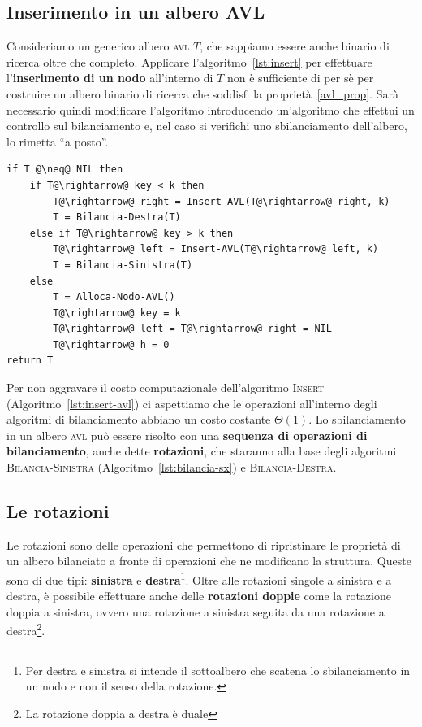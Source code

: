 \subsection{Inserimento in un albero AVL}
Consideriamo un generico albero \textsc{avl} $T$, che sappiamo essere anche binario di ricerca oltre che completo. Applicare l'algoritmo~\ref{lst:insert} per effettuare l'\textbf{inserimento di un nodo} all'interno di $T$ non è sufficiente di per sè per costruire un albero binario di ricerca che soddisfi la proprietà~\ref{avl_prop}. Sarà necessario quindi modificare l'algoritmo introducendo un'algoritmo che effettui un controllo sul bilanciamento e, nel caso si verifichi uno sbilanciamento dell'albero, lo rimetta ``a posto''.

\begin{lstlisting}[language=asd,caption={\textsc{Insert-AVL(T,k)}},label=lst:insert-avl]
if T @\neq@ NIL then
	if T@\rightarrow@ key < k then
		T@\rightarrow@ right = Insert-AVL(T@\rightarrow@ right, k)
		T = Bilancia-Destra(T)
	else if T@\rightarrow@ key > k then
		T@\rightarrow@ left = Insert-AVL(T@\rightarrow@ left, k)
		T = Bilancia-Sinistra(T)
	else
		T = Alloca-Nodo-AVL()
		T@\rightarrow@ key = k
		T@\rightarrow@ left = T@\rightarrow@ right = NIL
		T@\rightarrow@ h = 0
return T
\end{lstlisting}

Per non aggravare il costo computazionale dell'algoritmo \textsc{Insert} (Algoritmo~\ref{lst:insert-avl}) ci aspettiamo che le operazioni all'interno degli algoritmi di bilanciamento abbiano un costo costante $\Theta(1)$. Lo sbilanciamento in un albero \textsc{avl} può essere risolto con una \textbf{sequenza di operazioni di bilanciamento}, anche dette \textbf{rotazioni}, che staranno alla base degli algoritmi \textsc{Bilancia-Sinistra} (Algoritmo~\ref{lst:bilancia-sx}) e \textsc{Bilancia-Destra}.

\subsection{Le rotazioni}
Le rotazioni sono delle operazioni che permettono di ripristinare le proprietà di un albero bilanciato a fronte di operazioni che ne modificano la struttura. Queste sono di due tipi: \textbf{sinistra} e \textbf{destra}\footnote{Per destra e sinistra si intende il sottoalbero che scatena lo sbilanciamento in un nodo e non il senso della rotazione.}. Oltre alle rotazioni singole a sinistra e a destra, è possibile effettuare anche delle \textbf{rotazioni doppie} come la rotazione doppia a sinistra, ovvero una rotazione a sinistra seguita da una rotazione a destra\footnote{La rotazione doppia a destra è duale}.

